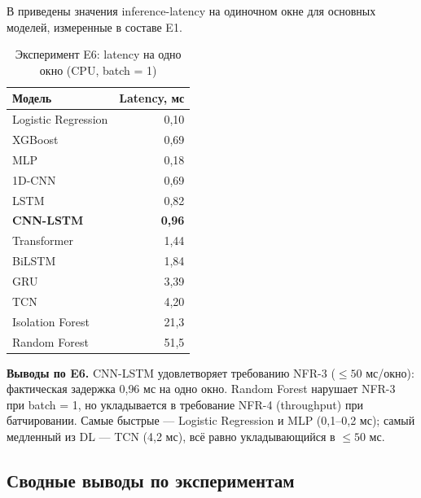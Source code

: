 \documentclass[14pt, a4paper]{extarticle}
\begin{document}
В  приведены значения inference-latency на
одиночном окне для основных моделей, измеренные в составе E1.

\begin{table}[H]
\centering
\caption{Эксперимент E6: latency на одно окно (CPU, batch = 1)}
\label{tab:E6-latency}
\renewcommand{\arraystretch}{1.2}
\begin{tabular}{lr}
\toprule
\textbf{Модель} & \textbf{Latency, мс} \\
\midrule
Logistic Regression & 0{,}10 \\
XGBoost             & 0{,}69 \\
MLP                 & 0{,}18 \\
1D-CNN              & 0{,}69 \\
LSTM                & 0{,}82 \\
\textbf{CNN-LSTM}   & \textbf{0{,}96} \\
Transformer         & 1{,}44 \\
BiLSTM              & 1{,}84 \\
GRU                 & 3{,}39 \\
TCN                 & 4{,}20 \\
Isolation Forest    & 21{,}3 \\
Random Forest       & 51{,}5 \\
\bottomrule
\end{tabular}
\end{table}

\textbf{Выводы по E6.} CNN-LSTM удовлетворяет требованию NFR-3
(\(\leq 50\) мс/окно): фактическая задержка 0{,}96 мс на одно окно.
Random Forest нарушает NFR-3 при batch = 1, но укладывается в требование
NFR-4 (throughput) при батчировании. Самые быстрые --- Logistic
Regression и MLP (0{,}1--0{,}2 мс); самый медленный из DL --- TCN
(4{,}2 мс), всё равно укладывающийся в \(\leq 50\) мс.

\subsection{Сводные выводы по экспериментам}
\end{document}
